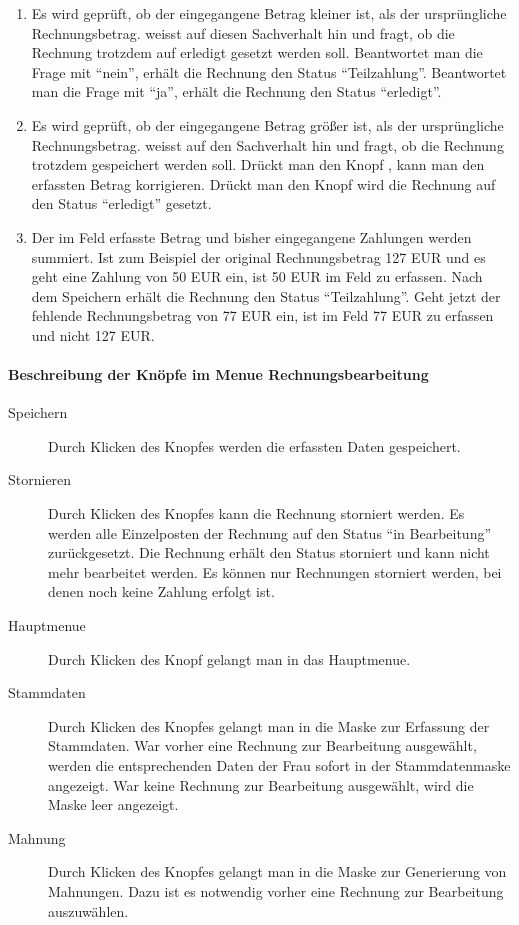 \begin{enumerate}
\item
Es wird geprüft, ob der eingegangene Betrag kleiner ist, als der ursprüngliche
Rechnungsbetrag. \tinyHeb\/ weisst auf diesen Sachverhalt hin und fragt,
ob die Rechnung trotzdem auf erledigt gesetzt werden soll. Beantwortet man
die Frage mit ``nein'', erhält die Rechnung den Status ``Teilzahlung''. 
Beantwortet man die Frage mit ``ja'', erhält die Rechnung den Status
``erledigt''.
\item
Es wird geprüft, ob der eingegangene Betrag größer ist, als der ursprüngliche
Rechnungsbetrag. \tinyHeb\/ weisst auf den Sachverhalt hin und fragt, ob die
Rechnung trotzdem gespeichert werden soll. Drückt man den Knopf
, kann man den erfassten Betrag korrigieren. Drückt man
den Knopf  wird die Rechnung auf den Status ``erledigt'' gesetzt.
\item 
Der im Feld  erfasste Betrag und bisher eingegangene
Zahlungen werden summiert. Ist zum Beispiel der original Rechnungsbetrag 
127 EUR und
es geht eine Zahlung von 50 EUR ein, ist 50 EUR im Feld 
zu erfassen. Nach dem Speichern erhält die Rechnung den Status ``Teilzahlung''.
Geht jetzt der fehlende Rechnungsbetrag von 77 EUR ein, ist im Feld
 77 EUR zu erfassen und nicht 127 EUR.
\end{enumerate}

\paragraph{Beschreibung der Knöpfe im Menue Rechnungsbearbeitung}
\begin{description}
\item[Speichern]
Durch Klicken des Knopfes  werden die erfassten Daten
gespeichert.
\item[Stornieren]
Durch Klicken des Knopfes  kann die Rechnung storniert
werden. Es werden alle Einzelposten der Rechnung auf den Status 
``in Bearbeitung'' zurückgesetzt. Die Rechnung erhält den Status storniert
und kann nicht mehr bearbeitet werden. Es können nur Rechnungen storniert
werden, bei denen noch keine Zahlung erfolgt ist.
\item[Hauptmenue]
Durch Klicken des Knopf  gelangt man in das Hauptmenue.
\item[Stammdaten]
Durch Klicken des Knopfes  gelangt man in die Maske zur
Erfassung der Stammdaten. War vorher eine Rechnung zur Bearbeitung
ausgewählt, werden die entsprechenden Daten der Frau sofort in der
Stammdatenmaske angezeigt. War keine Rechnung zur Bearbeitung ausgewählt,
wird die Maske leer angezeigt.
\item[Mahnung]
Durch Klicken des Knopfes  gelangt man in die Maske zur
Generierung von Mahnungen. Dazu ist es notwendig vorher eine Rechnung
zur Bearbeitung auszuwählen.
\end{description}



